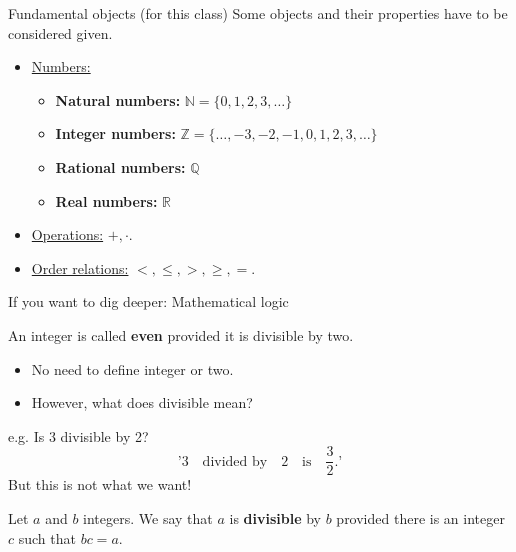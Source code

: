 \documentclass{beamer}
\begin{document}
\begin{frame}{Fundamental objects (for this class)}
Some objects and their properties have to be considered given. 
\begin{itemize}
\item \underline{Numbers:}
\begin{itemize}
\item \textbf{Natural numbers:} $\mathbb{N}=\{0,1,2,3,\dots\}$
\item \textbf{Integer numbers:} $\mathbb{Z}=\{\dots, -3,-2,-1,0,1,2,3,\dots\}$
\item \textbf{Rational numbers:} $\mathbb{Q}$
\item \textbf{Real numbers:} $\mathbb{R}$
\end{itemize}
\item \underline{Operations:} $+,\cdot$.
\item \underline{Order relations:} $<,\leq,>,\geq,=$.
\end{itemize}

\vspace{1cm}
If you want to dig deeper: \alert{Mathematical logic}
\end{frame}

\begin{frame}
\begin{definition}
An integer is called \textbf{even} provided it is divisible by two.
\end{definition}\pause

\begin{itemize}
\item No need to define integer or two.
\item However, what does divisible mean?
\end{itemize}
e.g. Is $3$ divisible by 2?
\[
\textrm{'$3$ ~~divided by~~ $2$~~ is~~ $\frac{3}{2}$.'}
\]
But this is not what we want!

\begin{definition}
Let $a$ and $b$ integers. We say that $a$ is \textbf{divisible} by $b$ provided there is an integer $c$ such that $bc=a$. 
\end{definition}
\end{frame}
\end{document}
